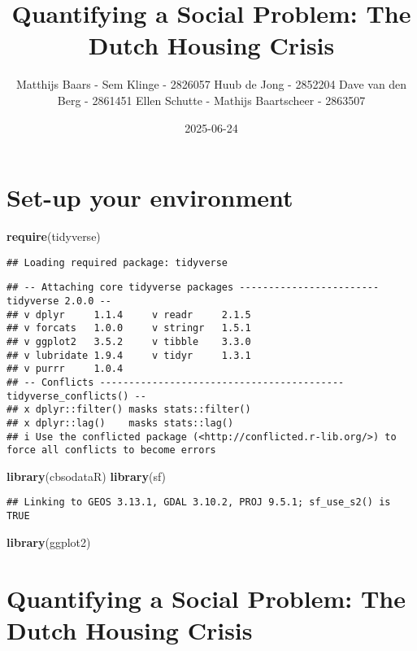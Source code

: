 \documentclass[
]{article}
\title{Quantifying a Social Problem: The Dutch Housing Crisis}
\author{Matthijs Baars - Sem Klinge - 2826057 Huub de Jong - 2852204
Dave van den Berg - 2861451 Ellen Schutte - Mathijs Baartscheer -
2863507}
\date{2025-06-24}
\newenvironment{Shaded}{\begin{snugshade}}{\end{snugshade}}
\newcommand{\FunctionTok}[1]{\textcolor[rgb]{0.13,0.29,0.53}{\textbf{#1}}}
\newcommand{\NormalTok}[1]{#1}
\begin{document}
\maketitle

\section{Set-up your environment}\label{set-up-your-environment}

\begin{Shaded}
\begin{Highlighting}[]
\FunctionTok{require}\NormalTok{(tidyverse)}
\end{Highlighting}
\end{Shaded}

\begin{verbatim}
## Loading required package: tidyverse
\end{verbatim}

\begin{verbatim}
## -- Attaching core tidyverse packages ------------------------ tidyverse 2.0.0 --
## v dplyr     1.1.4     v readr     2.1.5
## v forcats   1.0.0     v stringr   1.5.1
## v ggplot2   3.5.2     v tibble    3.3.0
## v lubridate 1.9.4     v tidyr     1.3.1
## v purrr     1.0.4     
## -- Conflicts ------------------------------------------ tidyverse_conflicts() --
## x dplyr::filter() masks stats::filter()
## x dplyr::lag()    masks stats::lag()
## i Use the conflicted package (<http://conflicted.r-lib.org/>) to force all conflicts to become errors
\end{verbatim}

\begin{Shaded}
\begin{Highlighting}[]
\FunctionTok{library}\NormalTok{(cbsodataR)}
\FunctionTok{library}\NormalTok{(sf)}
\end{Highlighting}
\end{Shaded}

\begin{verbatim}
## Linking to GEOS 3.13.1, GDAL 3.10.2, PROJ 9.5.1; sf_use_s2() is TRUE
\end{verbatim}

\begin{Shaded}
\begin{Highlighting}[]
\FunctionTok{library}\NormalTok{(ggplot2)}
\end{Highlighting}
\end{Shaded}

\section{Quantifying a Social Problem: The Dutch Housing
Crisis}\label{quantifying-a-social-problem-the-dutch-housing-crisis}
\end{document}
